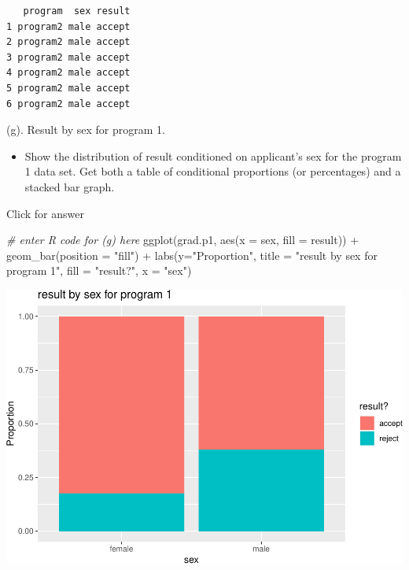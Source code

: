 \documentclass[
]{book}
\newenvironment{Shaded}{\begin{snugshade}}{\end{snugshade}}
\newcommand{\AttributeTok}[1]{\textcolor[rgb]{0.77,0.63,0.00}{#1}}
\newcommand{\CommentTok}[1]{\textcolor[rgb]{0.56,0.35,0.01}{\textit{#1}}}
\newcommand{\FunctionTok}[1]{\textcolor[rgb]{0.00,0.00,0.00}{#1}}
\newcommand{\NormalTok}[1]{#1}
\newcommand{\SpecialCharTok}[1]{\textcolor[rgb]{0.00,0.00,0.00}{#1}}
\newcommand{\StringTok}[1]{\textcolor[rgb]{0.31,0.60,0.02}{#1}}
\providecommand{\tightlist}{%
  \setlength{\itemsep}{0pt}\setlength{\parskip}{0pt}}
\begin{document}
\begin{verbatim}
   program  sex result
1 program2 male accept
2 program2 male accept
3 program2 male accept
4 program2 male accept
5 program2 male accept
6 program2 male accept
\end{verbatim}

(g). Result by sex for program 1.

\begin{itemize}
\tightlist
\item
  Show the distribution of result conditioned on applicant's sex for the program 1 data set. Get both a table of conditional proportions (or percentages) and a stacked bar graph.
\end{itemize}

Click for answer

\begin{Shaded}
\begin{Highlighting}[]
\CommentTok{\# enter R code for (g) here}
\FunctionTok{ggplot}\NormalTok{(grad.p1, }\FunctionTok{aes}\NormalTok{(}\AttributeTok{x =}\NormalTok{ sex, }\AttributeTok{fill =}\NormalTok{ result)) }\SpecialCharTok{+}
 \FunctionTok{geom\_bar}\NormalTok{(}\AttributeTok{position =} \StringTok{"fill"}\NormalTok{) }\SpecialCharTok{+}
 \FunctionTok{labs}\NormalTok{(}\AttributeTok{y=}\StringTok{"Proportion"}\NormalTok{, }\AttributeTok{title =} \StringTok{"result by sex for program 1"}\NormalTok{,}
 \AttributeTok{fill =} \StringTok{"result?"}\NormalTok{, }\AttributeTok{x =} \StringTok{"sex"}\NormalTok{)}
\end{Highlighting}
\end{Shaded}

\includegraphics[width=1\linewidth]{Class_Activity_4_files/figure-latex/unnamed-chunk-29-1}
\end{document}
